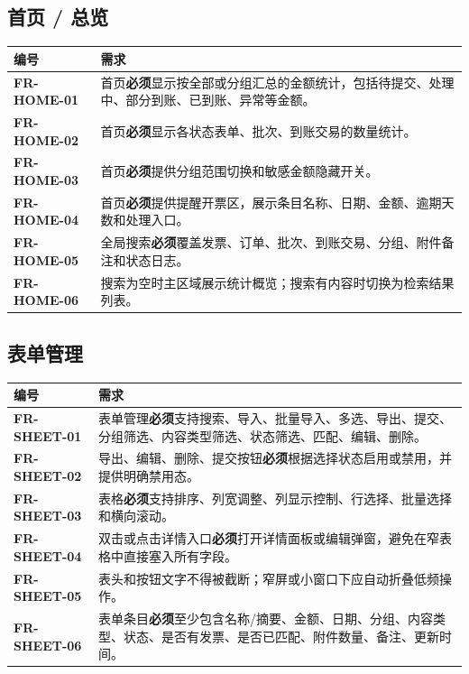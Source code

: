 \documentclass[UTF8,zihao=-4]{ctexart}
\newcommand{\req}[1]{\textbf{\textcolor{ivicBrown}{#1}}}
\newcommand{\must}{\textbf{必须}}
\begin{document}
\subsection{首页 / 总览}

\begin{longtable}{p{2.8cm}p{11.6cm}}
\toprule
编号 & 需求 \\
\midrule
\req{FR-HOME-01} & 首页\must{}显示按全部或分组汇总的金额统计，包括待提交、处理中、部分到账、已到账、异常等金额。 \\
\req{FR-HOME-02} & 首页\must{}显示各状态表单、批次、到账交易的数量统计。 \\
\req{FR-HOME-03} & 首页\must{}提供分组范围切换和敏感金额隐藏开关。 \\
\req{FR-HOME-04} & 首页\must{}提供提醒开票区，展示条目名称、日期、金额、逾期天数和处理入口。 \\
\req{FR-HOME-05} & 全局搜索\must{}覆盖发票、订单、批次、到账交易、分组、附件备注和状态日志。 \\
\req{FR-HOME-06} & 搜索为空时主区域展示统计概览；搜索有内容时切换为检索结果列表。 \\
\bottomrule
\end{longtable}

\subsection{表单管理}

\begin{longtable}{p{2.8cm}p{11.6cm}}
\toprule
编号 & 需求 \\
\midrule
\req{FR-SHEET-01} & 表单管理\must{}支持搜索、导入、批量导入、多选、导出、提交、分组筛选、内容类型筛选、状态筛选、匹配、编辑、删除。 \\
\req{FR-SHEET-02} & 导出、编辑、删除、提交按钮\must{}根据选择状态启用或禁用，并提供明确禁用态。 \\
\req{FR-SHEET-03} & 表格\must{}支持排序、列宽调整、列显示控制、行选择、批量选择和横向滚动。 \\
\req{FR-SHEET-04} & 双击或点击详情入口\must{}打开详情面板或编辑弹窗，避免在窄表格中直接塞入所有字段。 \\
\req{FR-SHEET-05} & 表头和按钮文字不得被截断；窄屏或小窗口下应自动折叠低频操作。 \\
\req{FR-SHEET-06} & 表单条目\must{}至少包含名称/摘要、金额、日期、分组、内容类型、状态、是否有发票、是否已匹配、附件数量、备注、更新时间。 \\
\bottomrule
\end{longtable}
\end{document}
